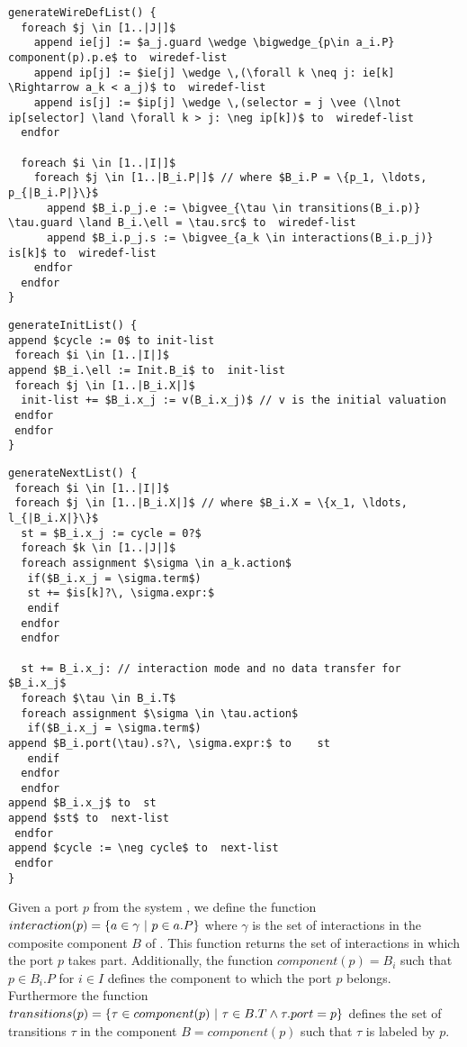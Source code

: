 \begin{lstlisting}
generateWireDefList() {
  foreach $j \in [1..|J|]$
    append ie[j] := $a_j.guard \wedge \bigwedge_{p\in a_i.P} component(p).p.e$ to  wiredef-list 
    append ip[j] := $ie[j] \wedge \,(\forall k \neq j: ie[k] \Rightarrow a_k < a_j)$ to  wiredef-list 
    append is[j] := $ip[j] \wedge \,(selector = j \vee (\lnot ip[selector] \land \forall k > j: \neg ip[k])$ to  wiredef-list 
  endfor

  foreach $i \in [1..|I|]$
    foreach $j \in [1..|B_i.P|]$ // where $B_i.P = \{p_1, \ldots, p_{|B_i.P|}\}$ 
      append $B_i.p_j.e := \bigvee_{\tau \in transitions(B_i.p)} \tau.guard \land B_i.\ell = \tau.src$ to  wiredef-list 
      append $B_i.p_j.s := \bigvee_{a_k \in interactions(B_i.p_j)} is[k]$ to  wiredef-list 
    endfor
  endfor
} 
\end{lstlisting}

\begin{lstlisting}
generateInitList() {
append $cycle := 0$ to init-list 
 foreach $i \in [1..|I|]$
append $B_i.\ell := Init.B_i$ to  init-list 
 foreach $j \in [1..|B_i.X|]$
  init-list += $B_i.x_j := v(B_i.x_j)$ // v is the initial valuation
 endfor
 endfor
}
\end{lstlisting}

\begin{lstlisting}
generateNextList() {
 foreach $i \in [1..|I|]$
 foreach $j \in [1..|B_i.X|]$ // where $B_i.X = \{x_1, \ldots, l_{|B_i.X|}\}$ 
  st = $B_i.x_j := cycle = 0?$
  foreach $k \in [1..|J|]$
  foreach assignment $\sigma \in a_k.action$
   if($B_i.x_j = \sigma.term$)
   st += $is[k]?\, \sigma.expr:$
   endif
  endfor
  endfor
 
  st += B_i.x_j: // interaction mode and no data transfer for $B_i.x_j$
  foreach $\tau \in B_i.T$ 
  foreach assignment $\sigma \in \tau.action$
   if($B_i.x_j = \sigma.term$)
append $B_i.port(\tau).s?\, \sigma.expr:$ to    st 
   endif
  endfor
  endfor  
append $B_i.x_j$ to  st 
append $st$ to  next-list 
 endfor
append $cycle := \neg cycle$ to  next-list 
 endfor
}
\end{lstlisting}


Given a port $p$ from the system \Pm, we define the function
$interaction(p) = \{ a \in \gamma~|~p \in a.P \}$ where $\gamma$
is the set of interactions in the composite component $B$ of \Pm.
This function returns the set of interactions in which the port 
$p$ takes part. Additionally, the function 
$component(p) = B_i$ such that $p \in B_i.P$ for $i \in I$ defines
the component to which the port $p$ belongs. Furthermore the function
$transitions(p) = \{ \tau \in component(p)~|~\tau \in B.T \land \tau.port = p \}$ defines the 
set of transitions $\tau$ in the component $B = component(p)$ such that $\tau$ 
is labeled by $p$. 

